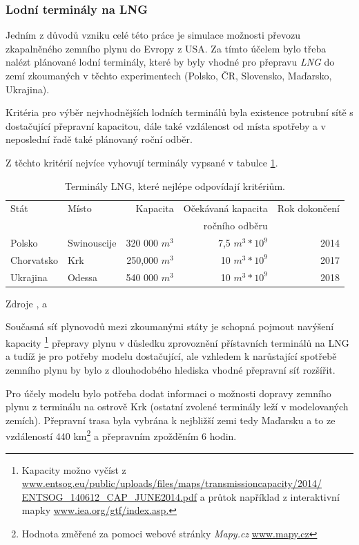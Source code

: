 \documentclass[a4paper,11pt]{article}
\begin{document}
\newpage
\subsubsection{Lodní terminály na LNG}\label{lng}

Jedním z důvodů vzniku celé této práce je simulace možnosti převozu zkapalněného zemního
plynu do Evropy z USA.
Za tímto účelem bylo třeba nalézt plánované lodní terminály, které  by byly vhodné pro
přepravu \textit{LNG} do zemí zkoumaných v těchto experimentech
(Polsko, ČR, Slovensko, Maďarsko, Ukrajina).

Kritéria pro výběr nejvhodnějších lodních terminálů byla existence potrubní sítě s
dostačující přepravní kapacitou, dále také vzdálenost od místa spotřeby a v neposlední
řadě také plánovaný roční odběr.

Z těchto kritérií nejvíce vyhovují terminály vypsané v tabulce \ref{lngtable}.

\begin{table}[h!]
\begin{center}
\begin{tabular}{|l|l|r|r|r|}
    \hline
    Stát		& Místo			& Kapacita 		& Očekávaná kapacita  & Rok dokončení\\
    			&				&				& ročního odběru		&\\
    \hline 
	Polsko		& Swinouscije	& 320 000 $m^3$	& 7,5 $m^3 * 10^9$	& 2014\\
	Chorvatsko 	& Krk			& 250,000 $m^3$	& 10 $m^3 * 10^9$	& 2017\\
	Ukrajina		& Odessa			& 540 000 $m^3$	& 10 $m^3 * 10^9$	& 2018\\
    \hline
\end{tabular}
\caption{Terminály LNG, které nejlépe odpovídají kritériům.}
\label{lngtable}
Zdroje \cite{lngeurope},\cite{lngkrk} a  \cite{lngukrajina}
\end{center}
\end{table}

Současná síť plynovodů mezi zkoumanými státy je schopná pojmout navýšení kapacity
\footnote{Kapacity možno vyčíst z
\url{www.entsog.eu/public/uploads/files/maps/transmissioncapacity/2014/
ENTSOG_140612_CAP_JUNE2014.pdf}
a průtok například z interaktivní mapky \url{www.iea.org/gtf/index.asp.}}
přepravy plynu v důsledku zprovoznění přístavních terminálů na LNG a tudíž je pro potřeby
modelu dostačující,
ale vzhledem k narůstající spotřebě zemního plynu by bylo z dlouhodobého hlediska vhodné 
přepravní síť rozšířit.

Pro účely modelu bylo potřeba dodat informaci o možnosti dopravy zemního plynu
z terminálu na ostrově Krk (ostatní zvolené terminály leží v modelovaných zemích).
Přepravní trasa byla vybrána k nejbližší zemi tedy Maďarsku a to ze vzdáleností 
440 km\footnote{Hodnota změřené za pomoci webové stránky \textit{Mapy.cz} \url{www.mapy.cz}}
a přepravním zpožděním 6 hodin.
\end{document}
